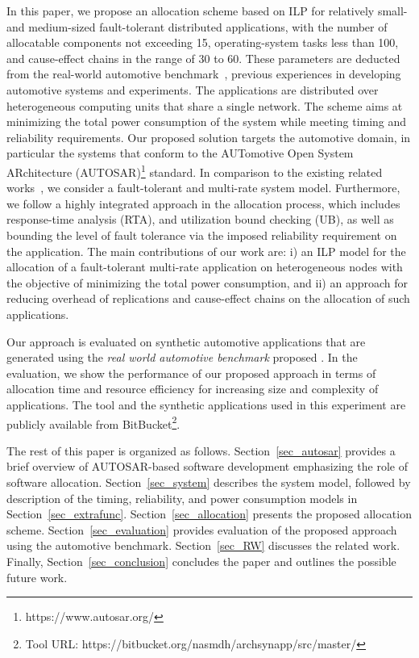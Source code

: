 In this paper, we propose an allocation scheme based on ILP for relatively small- and medium-sized fault-tolerant distributed applications, with the number of allocatable components not exceeding 15, operating-system tasks less than 100, and cause-effect chains in the range of 30 to 60. These parameters are deducted from the real-world automotive benchmark~\cite{Kramer2015RealFree}, previous experiences in developing automotive systems and experiments. The applications are distributed over heterogeneous computing units that share a single network. The scheme aims at minimizing the total power consumption of the system while meeting timing and reliability requirements. Our proposed solution targets the automotive domain, in particular the systems that conform to the AUTomotive Open System ARchitecture (AUTOSAR)\footnote{https://www.autosar.org/} standard. In comparison to the existing related works~\cite{Wozniak2013AnArchitectures,vsvogor2014extended,Saidi2015AnArchitectures}, we consider a fault-tolerant and multi-rate system model. Furthermore, we follow a highly integrated approach in the allocation process, which includes response-time analysis (RTA), and utilization bound checking (UB), as well as bounding the level of fault tolerance via the imposed reliability requirement on the application. The main contributions of our work are: i) an ILP model for the allocation of a fault-tolerant multi-rate application on heterogeneous nodes with the objective of minimizing the total power consumption, and ii) an approach for reducing overhead of replications and cause-effect chains on the allocation of such applications.

Our approach is evaluated on synthetic automotive applications that are generated using the \textit{real world automotive benchmark} proposed
\cite{Kramer2015RealFree}. In the evaluation, we show the performance of our proposed approach in terms of allocation time and resource efficiency for increasing size and complexity of applications. The tool and the synthetic applications used in this experiment are publicly available from BitBucket\footnote{Tool URL: https://bitbucket.org/nasmdh/archsynapp/src/master/}. 

The rest of this paper is organized as follows. Section~\ref{sec_autosar} provides a brief overview of AUTOSAR-based software development emphasizing the role of software allocation. Section~\ref{sec_system} describes the system model, followed by description of the timing, reliability, and power consumption models in Section~\ref{sec_extrafunc}. Section~\ref{sec_allocation} presents the proposed allocation scheme. Section~\ref{sec_evaluation} provides evaluation of the proposed approach using the automotive benchmark. Section~\ref{sec_RW} discusses the related work. Finally, Section~\ref{sec_conclusion} concludes the paper and outlines the possible future work.

